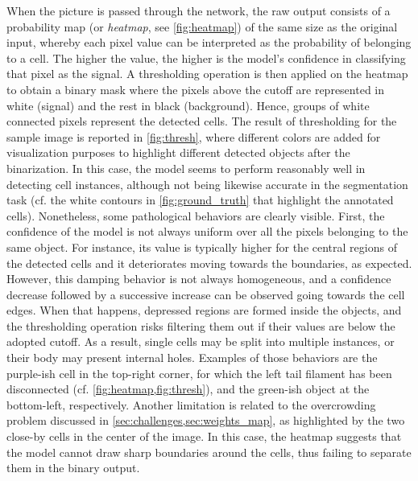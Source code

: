 When the picture is passed through the network, the raw output consists of a probability map (or \textit{heatmap}, see \cref{fig:heatmap}) of the same size as the original input, whereby each pixel value can be interpreted as the probability of belonging to a cell. 
The higher the value, the higher is the model's confidence in classifying that pixel as the signal. 
A thresholding operation is then applied on the heatmap to obtain a binary mask where the pixels above the cutoff are represented in white (signal) and the rest in black (background).
Hence, groups of white connected pixels represent the detected cells. 
The result of thresholding for the sample image is reported in \cref{fig:thresh}, where different colors are added for visualization purposes to highlight different detected objects after the binarization.
In this case, the model seems to perform reasonably well in detecting cell instances, although not being likewise accurate in the segmentation task (cf. the white contours in \cref{fig:ground_truth} that highlight the annotated cells).
Nonetheless, some pathological behaviors are clearly visible.
First, the confidence of the model is not always uniform over all the pixels belonging to the same object.
For instance, its value is typically higher for the central regions of the detected cells and it deteriorates moving towards the boundaries, as expected.
However, this damping behavior is not always homogeneous, and a confidence decrease followed by a successive increase can be observed going towards the cell edges.
When that happens, depressed regions are formed inside the objects, and the thresholding operation risks filtering them out if their values are below the adopted cutoff.
As a result, single cells may be split into multiple instances, or their body may present internal holes.
Examples of those behaviors are the purple-ish cell in the top-right corner, for which the left tail filament has been disconnected (cf. \cref{fig:heatmap,fig:thresh}), and the green-ish object at the bottom-left, respectively. %
Another limitation is related to the overcrowding problem discussed in \cref{sec:challenges,sec:weights_map}, as highlighted by the two close-by cells in the center of the image.
In this case, the heatmap suggests that the model cannot draw sharp boundaries around the cells, thus failing to separate them in the binary output. 

